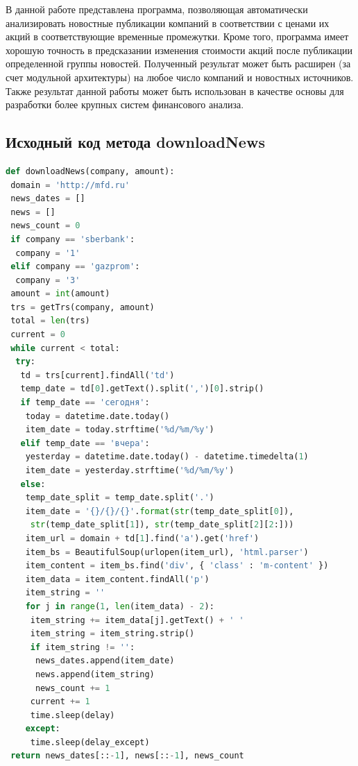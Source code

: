 \documentclass[14pt]{matmex-diploma-custom}
\begin{document}
В данной работе представлена программа, позволяющая автоматически анализировать новостные публикации компаний в соответствии с ценами их акций в соответствующие временные промежутки. Кроме того, программа имеет хорошую точность в предсказании изменения стоимости акций после публикации определенной группы новостей. Полученный результат может быть расширен (за счет модульной архитектуры) на любое число компаний и новостных источников. Также результат данной работы может быть использован в качестве основы для разработки более крупных систем финансового анализа.

\setmonofont[Mapping=tex-text]{CMU Typewriter Text}



\begin{appendices}

\section{Исходный код метода downloadNews}

\label{code:downloadNews}

\begin{footnotesize}
\begin{lstlisting}[language=Python]
def downloadNews(company, amount):
 domain = 'http://mfd.ru'
 news_dates = []
 news = []
 news_count = 0
 if company == 'sberbank':
  company = '1'
 elif company == 'gazprom':
  company = '3'
 amount = int(amount)
 trs = getTrs(company, amount)
 total = len(trs)
 current = 0
 while current < total:
  try:
   td = trs[current].findAll('td')
   temp_date = td[0].getText().split(',')[0].strip()
   if temp_date == 'сегодня':
    today = datetime.date.today()
    item_date = today.strftime('%d/%m/%y')
   elif temp_date == 'вчера':
    yesterday = datetime.date.today() - datetime.timedelta(1)
    item_date = yesterday.strftime('%d/%m/%y')
   else:
    temp_date_split = temp_date.split('.')
    item_date = '{}/{}/{}'.format(str(temp_date_split[0]),
     str(temp_date_split[1]), str(temp_date_split[2][2:]))
    item_url = domain + td[1].find('a').get('href')
    item_bs = BeautifulSoup(urlopen(item_url), 'html.parser')
    item_content = item_bs.find('div', { 'class' : 'm-content' })
    item_data = item_content.findAll('p')
    item_string = ''
    for j in range(1, len(item_data) - 2):
     item_string += item_data[j].getText() + ' '
     item_string = item_string.strip()
     if item_string != '':
      news_dates.append(item_date)
      news.append(item_string)
      news_count += 1
     current += 1
     time.sleep(delay)
    except:
     time.sleep(delay_except)
 return news_dates[::-1], news[::-1], news_count
\end{lstlisting}
\end{footnotesize}


\end{appendices}
\end{document}
